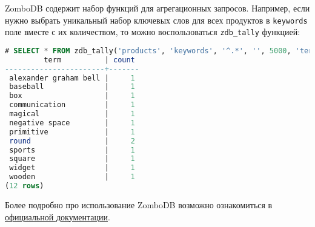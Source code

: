 ZomboDB содержит набор функций для агрегационных запросов. Например, если нужно выбрать уникальный набор ключевых слов для всех продуктов в \lstinline!keywords! поле вместе с их количеством, то можно воспользоваться \lstinline!zdb_tally! функцией:

\begin{lstlisting}[language=SQL,label=lst:zombodb8,caption=Zdb\_tally]
# SELECT * FROM zdb_tally('products', 'keywords', '^.*', '', 5000, 'term');
         term          | count
-----------------------+-------
 alexander graham bell |     1
 baseball              |     1
 box                   |     1
 communication         |     1
 magical               |     1
 negative space        |     1
 primitive             |     1
 round                 |     2
 sports                |     1
 square                |     1
 widget                |     1
 wooden                |     1
(12 rows)
\end{lstlisting}

Более подробно про использование ZomboDB возможно ознакомиться в \href{https://github.com/zombodb/zombodb#quick-links}{официальной документации}.
